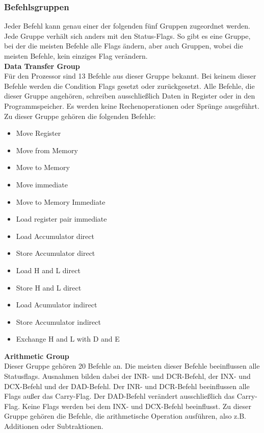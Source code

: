 \documentclass[12pt]{article}
\begin{document}
\subsubsection{Befehlsgruppen}
Jeder Befehl kann genau einer der folgenden fünf Gruppen zugeordnet werden. Jede Gruppe verhält sich anders mit den Status-Flags. So gibt es eine Gruppe, bei der die meisten Befehle alle Flags ändern, aber auch Gruppen, wobei die meisten Befehle, kein einziges Flag verändern. 
\\

\noindent
\textbf{Data Transfer Group}\\
Für den Prozessor sind 13 Befehle aus dieser Gruppe bekannt. Bei keinem dieser Befehle werden die Condition Flags gesetzt oder zurückgesetzt. Alle Befehle, die dieser Gruppe angehören, schreiben ausschließlich Daten in Register oder in den Programmspeicher. Es werden keine Rechenoperationen oder Sprünge ausgeführt. Zu dieser Gruppe gehören die folgenden Befehle:

\begin{multicols}{2}
\begin{itemize}
\item Move Register
\item Move from Memory
\item Move to Memory
\item Move immediate
\item Move to Memory Immediate
\item Load register pair immediate
\item Load Accumulator direct
\item Store Accumulator direct
\item Load H and L direct
\item Store H and L direct
\item Load Acumulator indirect
\item Store Accumulator indirect
\item Exchange H and L with D and E
\end{itemize}
\end{multicols}

\vspace{10pt}
\noindent
\textbf{Arithmetic Group}\\
Dieser Gruppe gehören 20 Befehle an. Die meisten dieser Befehle beeinflussen alle Statusflags. Ausnahmen bilden dabei der INR- und DCR-Befehl, der INX- und DCX-Befehl und der DAD-Befehl. Der INR- und DCR-Befehl beeinflussen alle Flags außer das Carry-Flag. Der DAD-Befehl verändert ausschließlich das Carry-Flag. Keine Flags werden bei dem INX- und DCX-Befehl beeinflusst. Zu dieser Gruppe gehören die Befehle, die arithmetische Operation ausführen, also z.B. Additionen oder Subtraktionen.
\end{document}
